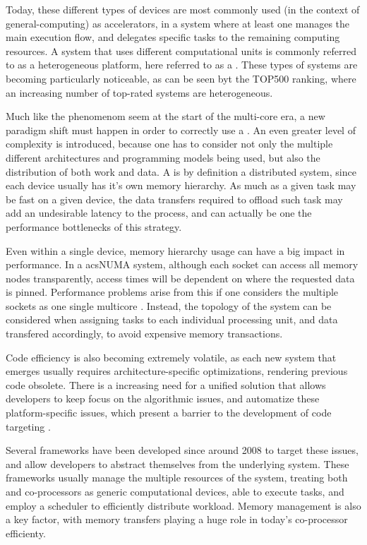 \documentclass[main.tex]{subfiles}
\begin{document}

Today, these different types of devices are most commonly used (in the context of general-computing) as accelerators, in a system where at least one \cpu manages the main execution flow, and delegates specific tasks to the remaining computing resources. A system that uses different computational units is commonly referred to as a heterogeneous platform, here referred to as a \hetplat. These types of systems are becoming particularly noticeable, as can be seen byt the TOP500 ranking, where an increasing number of top-rated systems are heterogeneous.

Much like the phenomenom seem at the start of the multi-core era, a new paradigm shift must happen in order to correctly use a \hetplat. An even greater level of complexity is introduced, because one has to consider not only the multiple different architectures and programming models being used, but also the distribution of both work and data. A \hetplat is by definition a distributed system, since each device usually has it's own memory hierarchy. As much as a given task may be fast on a given device, the data transfers required to offload such task may add an undesirable latency to the process, and can actually be one the performance bottlenecks of this strategy.

Even within a single device, memory hierarchy usage can have a big impact in performance. In a acs{NUMA} system, although each socket can access all memory nodes transparently, access times will be dependent on where the requested data is pinned. Performance problems arise from this if one considers the multiple sockets as one single multicore \cpu. Instead, the topology of the system can be considered when assigning tasks to each individual processing unit, and data transfered accordingly, to avoid expensive memory transactions.

Code efficiency is also becoming extremely volatile, as each new system that emerges usually requires architecture-specific optimizations, rendering previous code obsolete. There is a increasing need for a unified solution that allows developers to keep focus on the algorithmic issues, and automatize these platform-specific issues, which present a barrier to the development of code targeting \hetplats.

Several frameworks have been developed since around 2008 to target these issues, and allow developers to abstract themselves from the underlying system. These frameworks usually manage the multiple resources of the system, treating both \cpus and co-processors as generic computational devices, able to execute tasks, and employ a scheduler to efficiently distribute workload. Memory management is also a key factor, with memory transfers playing a huge role in today's co-processor efficienty.
\end{document}

